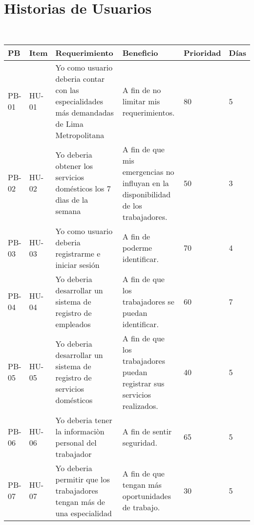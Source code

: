 \chapter{Historias de Usuarios}\\
\centering
\begin{tabular}{ |p{1.2  cm}|p{1.2 cm}|p{3.5cm}|p{3.5cm}|p{1.2cm}|p{1.2 cm}|  }
	\hline
	\rowcolor{blue!40}  \textbf {PB} & \textbf{Item} & \textbf{Requerimiento} & \textbf{Beneficio} & \textbf{Prioridad}  & \textbf{Días}\\  \hline
	
	\centering PB-01 & \centering HU-01  & Yo como usuario deberia contar con las especialidades más demandadas de Lima Metropolitana  &  A fin de no limitar mis requerimientos. &  80 &  5 \\   \hline
	\centering PB-02 & \centering HU-02 &  Yo deberia obtener los servicios domésticos los 7 dìas de la semana  & A fin de que mis emergencias no influyan en la disponibilidad de los trabajadores.  &   50 & 3   \\   \hline
	\centering PB-03 & \centering HU-03  &  Yo como usuario deberia registrarme e iniciar sesión & A fin de poderme identificar. 
	 &   70 &   4  \\   \hline
	\centering PB-04 & \centering HU-04 &  Yo deberia desarrollar un sistema de registro de empleados & A fin de que los trabajadores se puedan identificar.  &   60 &   7  \\   \hline
	\centering PB-05 & \centering HU-05 &  Yo deberia desarrollar un sistema de registro de servicios domésticos & A fin de que los trabajadores puedan registrar sus servicios realizados.  &   40 &   5  \\   \hline
	\centering PB-06 & \centering HU-06 &  Yo deberia tener la informaciòn personal del trabajador  & A fin de sentir seguridad.  &  65  &   5  \\   \hline
	\centering PB-07 & \centering HU-07 &  Yo deberia permitir que los trabajadores tengan más de una especialidad  & A fin de que tengan más oportunidades de trabajo.   &   30 &   5 \\   \hline
	
\end{tabular}